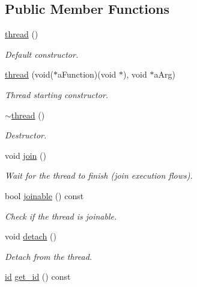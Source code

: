\subsection*{Public Member Functions}
\begin{DoxyCompactItemize}
\item 
\hyperlink{classtthread_1_1thread_af1f7b6e700fa71b1bc512a1f508933d6}{thread} ()
\begin{DoxyCompactList}\small\item\em Default constructor. \end{DoxyCompactList}\item 
\hyperlink{classtthread_1_1thread_a5a1d8417c9cb6abf06c222e981d7c13b}{thread} (void($\ast$a\+Function)(void $\ast$), void $\ast$a\+Arg)
\begin{DoxyCompactList}\small\item\em Thread starting constructor. \end{DoxyCompactList}\item 
\hyperlink{classtthread_1_1thread_aacd6456ae71b33c0955d5c0b212f59bd}{$\sim$thread} ()
\begin{DoxyCompactList}\small\item\em Destructor. \end{DoxyCompactList}\item 
void \hyperlink{classtthread_1_1thread_a8ce56d9ab2bf8c189f8296b096932a58}{join} ()
\begin{DoxyCompactList}\small\item\em Wait for the thread to finish (join execution flows). \end{DoxyCompactList}\item 
bool \hyperlink{classtthread_1_1thread_aed662d0fc6f7c0533036f3d540daab61}{joinable} () const 
\begin{DoxyCompactList}\small\item\em Check if the thread is joinable. \end{DoxyCompactList}\item 
void \hyperlink{classtthread_1_1thread_a28dd200d749fcfffcbf8844672f81ef4}{detach} ()
\begin{DoxyCompactList}\small\item\em Detach from the thread. \end{DoxyCompactList}\item 
\hyperlink{classtthread_1_1thread_1_1id}{id} \hyperlink{classtthread_1_1thread_a0f248c5cb0a153c4a30ae2816321298f}{get\+\_\+id} () const \hypertarget{classtthread_1_1thread_a0f248c5cb0a153c4a30ae2816321298f}{}\label{classtthread_1_1thread_a0f248c5cb0a153c4a30ae2816321298f}


\end{DoxyCompactItemize}
